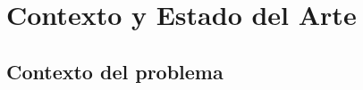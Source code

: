 \chapter{Contexto y Estado del Arte}

\section{Contexto del problema}
\label{cap:fundamentos}

%
%
%
%
%
%

